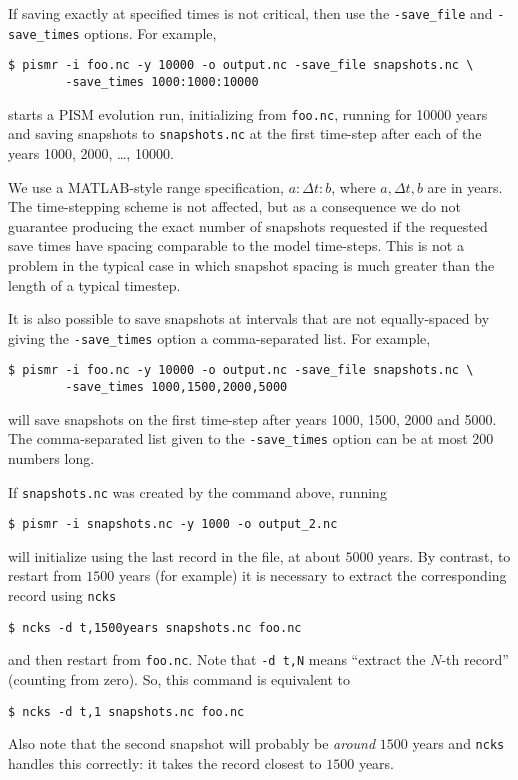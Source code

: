 If saving exactly at specified times is not critical, then use the \texttt{-save_file} and \texttt{-save_times} options.  For example,
\begin{verbatim}
$ pismr -i foo.nc -y 10000 -o output.nc -save_file snapshots.nc \
        -save_times 1000:1000:10000
\end{verbatim}
starts a PISM evolution run, initializing from \texttt{foo.nc}, running for
10000 years and saving snapshots to \texttt{snapshots.nc} at the first time-step
after each of the years 1000, 2000, \dots, 10000.

We use a MATLAB-style range specification, $a:\Delta t:b$, where $a,\Delta t,b$ are in years.  The time-stepping scheme is not affected, but as a consequence we do not guarantee producing the exact number of snapshots requested if the requested save times have spacing comparable to the model time-steps.  This is not a problem in the typical case in which snapshot spacing is much greater than the length of a typical timestep.

It is also possible to save snapshots at intervals that are not equally-spaced
by giving the \texttt{-save_times} option a comma-separated list. For example,
\begin{verbatim}
$ pismr -i foo.nc -y 10000 -o output.nc -save_file snapshots.nc \
        -save_times 1000,1500,2000,5000
\end{verbatim}
will save snapshots on the first time-step after years 1000, 1500, 2000 and 5000.
The comma-separated list given to the \texttt{-save_times} option can be at most 200 numbers long.

If \texttt{snapshots.nc} was created by the command above, running
\begin{verbatim}
$ pismr -i snapshots.nc -y 1000 -o output_2.nc
\end{verbatim}
will initialize using the last record in the file, at about $5000$ years.  By contrast, to restart from $1500$ years (for example) it is necessary to extract the corresponding record using \texttt{ncks}
\begin{verbatim}
$ ncks -d t,1500years snapshots.nc foo.nc
\end{verbatim}
and then restart from \texttt{foo.nc}.  Note that \texttt{-d t,N} means ``extract the $N$-th record'' (counting from zero).  So, this command is equivalent to
\begin{verbatim}
$ ncks -d t,1 snapshots.nc foo.nc
\end{verbatim}
Also note that the second snapshot will probably be \emph{around} $1500$ years and \texttt{ncks} handles this correctly: it takes the record closest to $1500$ years.

